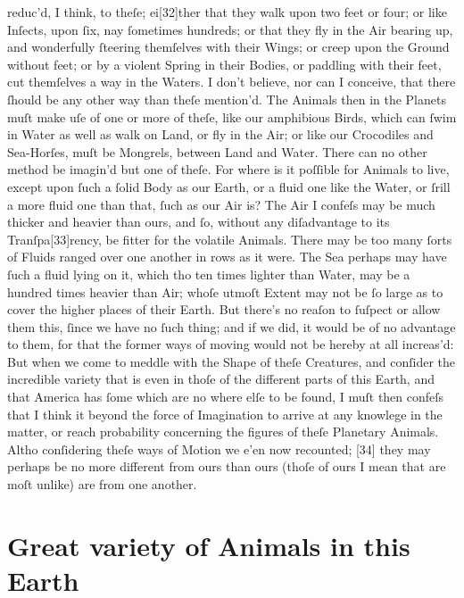 \documentclass[letterpaper]{book}
\begin{document}
reduc'd, I think, to theſe; ei[32]ther that they walk upon two feet or four;
or like Inſects, upon ſix, nay ſometimes hundreds; or that they fly in the Air
bearing up, and wonderfully ſteering themſelves with their Wings; or creep
upon the Ground without feet; or by a violent Spring in their Bodies, or
paddling with their feet, cut themſelves a way in the Waters.  I don't
believe, nor can I conceive, that there ſhould be any other way than theſe
mention'd. The Animals then in the Planets muſt make uſe of one or more of
theſe, like our amphibious Birds, which can ſwim in Water as well as walk on
Land, or fly in the Air; or like our Crocodiles and Sea-Horſes, muſt be
Mongrels, between Land and Water. There can no other method be imagin'd but
one of theſe. For where is it poſſible for Animals to live, except upon ſuch a
ſolid Body as our Earth, or a fluid one like the Water, or ſrill a more fluid
one than that, ſuch as our Air is? The Air I confeſs may be much thicker and
heavier than ours, and ſo, without any diſadvantage to its Tranſpa[33]rency,
be fitter for the volatile Animals. There may be too many ſorts of Fluids
ranged over one another in rows as it were. The Sea perhaps may have ſuch a
fluid lying on it, which tho ten times lighter than Water, may be a hundred
times heavier than Air; whoſe utmoſt Extent may not be ſo large as to cover
the higher places of their Earth. But there's no reaſon to ſuſpect or allow
them this, ſince we have no ſuch thing; and if we did, it would be of no
advantage to them, for that the former ways of moving would not be hereby at
all increas'd: But when we come to meddle with the Shape of theſe Creatures,
and conſider the incredible variety that is even in thoſe of the different
parts of this Earth, and that America has ſome which are no where elſe to be
found, I muſt then confeſs that I think it beyond the force of Imagination to
arrive at any knowlege in the matter, or reach probability concerning the
figures of theſe Planetary Animals. Altho conſidering theſe ways of Motion we
e'en now recounted; [34] they may perhaps be no more different from ours than
ours (thoſe of ours I mean that are moſt unlike) are from one another.


\section{Great variety of Animals in this Earth}
\end{document}
